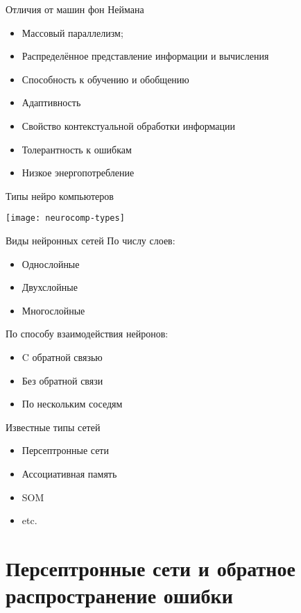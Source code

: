 \documentclass[14pt, fleqn, xcolor={dvipsnames, table}]{beamer}
\begin{document}
\begin{frame}{Отличия от машин фон Неймана}
\begin{itemize}
  \item Массовый параллелизм;
  \item Распределённое представление информации и вычисления
  \item Способность к обучению и обобщению
  \item Адаптивность
  \item Свойство контекстуальной обработки информации
  \item Толерантность к ошибкам
  \item Низкое энергопотребление
\end{itemize}
\end{frame}

\begin{frame}{Типы нейро компьютеров}
\begin{center}
\texttt{[image: neurocomp-types]}
\end{center}
\end{frame}

\begin{frame}{Виды нейронных сетей}
По числу слоев:
\begin{itemize}
  \item Однослойные 
  \item Двухслойные
  \item Многослойные
\end{itemize}

По способу взаимодействия нейронов:
\begin{itemize}
  \item C обратной связью
  \item Без обратной связи
  \item По нескольким соседям
\end{itemize}
\end{frame}

\begin{frame}{Известные типы сетей}
\begin{itemize}
  \item Персептронные сети
  \item Ассоциативная память
  \item SOM
  \item etc.
\end{itemize}
\end{frame}

\section{Персептронные сети и обратное распространение ошибки}
\end{document}

